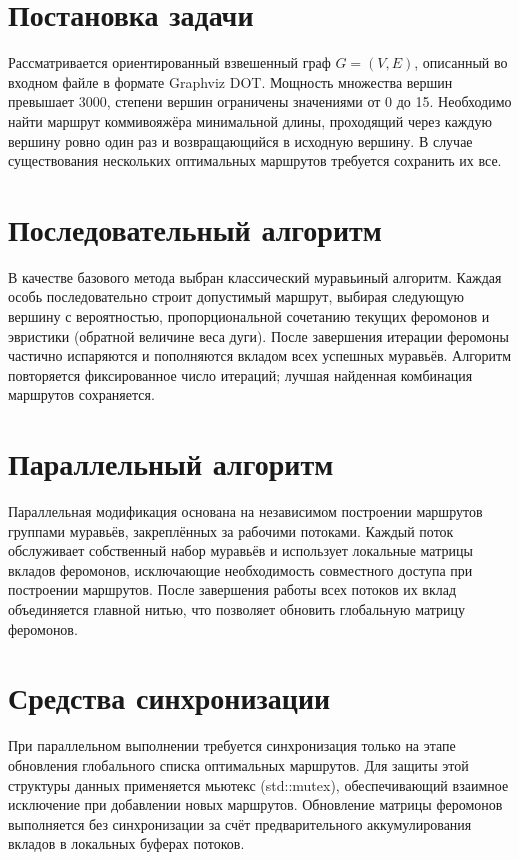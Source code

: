 
\section*{Постановка задачи}
Рассматривается ориентированный взвешенный граф $G = (V, E)$, описанный во входном файле в
формате Graphviz DOT. Мощность множества вершин превышает 3000, степени вершин ограничены
значениями от 0 до 15. Необходимо найти маршрут коммивояжёра минимальной длины, проходящий
через каждую вершину ровно один раз и возвращающийся в исходную вершину. В случае
существования нескольких оптимальных маршрутов требуется сохранить их все.

\section*{Последовательный алгоритм}
В качестве базового метода выбран классический муравьиный алгоритм. Каждая особь
последовательно строит допустимый маршрут, выбирая следующую вершину с вероятностью,
пропорциональной сочетанию текущих феромонов и эвристики (обратной величине веса дуги).
После завершения итерации феромоны частично испаряются и пополняются вкладом всех
успешных муравьёв. Алгоритм повторяется фиксированное число итераций; лучшая найденная
комбинация маршрутов сохраняется.

\section*{Параллельный алгоритм}
Параллельная модификация основана на независимом построении маршрутов группами муравьёв,
закреплённых за рабочими потоками. Каждый поток обслуживает собственный набор муравьёв и
использует локальные матрицы вкладов феромонов, исключающие необходимость совместного
доступа при построении маршрутов. После завершения работы всех потоков их вклад
объединяется главной нитью, что позволяет обновить глобальную матрицу феромонов.

\section*{Средства синхронизации}
При параллельном выполнении требуется синхронизация только на этапе обновления глобального
списка оптимальных маршрутов. Для защиты этой структуры данных применяется мьютекс
(std::mutex), обеспечивающий взаимное исключение при добавлении новых маршрутов.
Обновление матрицы феромонов выполняется без синхронизации за счёт предварительного
аккумулирования вкладов в локальных буферах потоков.

